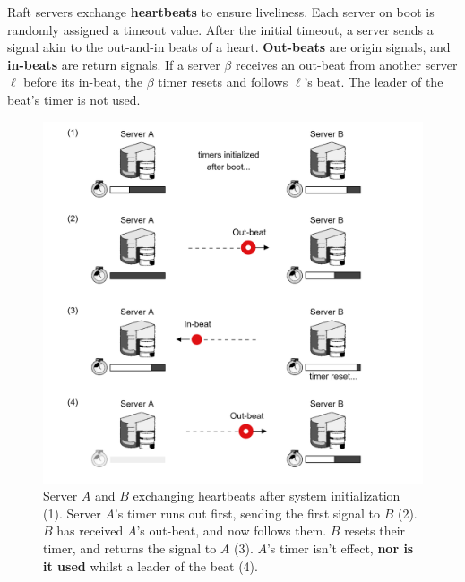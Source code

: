 \newpage 

\noindent
\begin{Def}

    Raft servers exchange \textbf{heartbeats} to ensure liveliness. Each server on boot is randomly assigned a timeout value.
    After the initial timeout, a server sends a signal akin to the out-and-in beats of a heart.
    \textbf{Out-beats} are origin signals, and \textbf{in-beats} are return signals. If a server $\beta$
    receives an out-beat from another server $\ell$ before its in-beat, the $\beta$ timer resets and follows $\ell$'s beat. 
    The leader of the beat's timer is not used.
\end{Def}

\vspace{-.5em}
\begin{figure}[h]
    \centering
    \includegraphics[width=.9\textwidth]{Sections/raft/heart.png}
    \caption{Server $A$ and $B$ exchanging heartbeats after system initialization (1).
    Server $A$'s timer runs out first, sending the first signal to $B$ (2). $B$ has received $A$'s out-beat, and now follows them. $B$ resets
    their timer, and returns the signal to $A$ (3).
    $A$'s timer isn't effect, \textbf{nor is it used} whilst a leader of the beat (4).}
\end{figure}

\newpage

